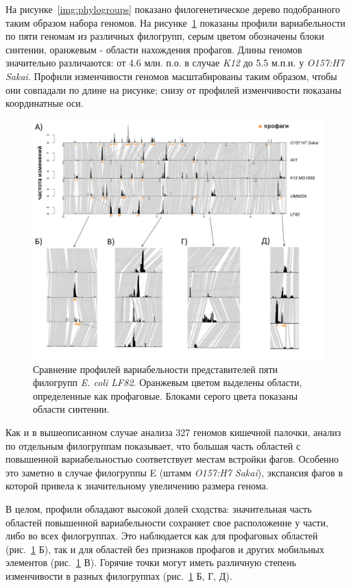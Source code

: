 На рисунке~\ref{img:phylogroups} показано филогенетическое дерево подобранного таким образом набора геномов. На рисунке~\ref{img:phylogroups_complex} показаны профили вариабельности по пяти геномам из различных филогрупп, серым цветом обозначены блоки синтении, оранжевым - области нахождения профагов. Длины геномов значительно различаются: от 4.6 млн. п.о. в случае \textit{K12} до 5.5 м.п.н. у \textit{O157:H7 Sakai}. Профили изменчивости геномов масштабированы таким образом, чтобы они совпадали по длине на рисунке; снизу от профилей изменчивости показаны координатные оси.

\begin{figure}[!ht] 
  \center
    \includegraphics[width=\textwidth]{Dissertation/images/complexity/coli_phylogroups_complexity_3.png}
  \caption{Сравнение профилей вариабельности представителей пяти филогрупп \textit{E. coli LF82}. Оранжевым цветом выделены области, определенные как профаговые. Блоками серого цвета показаны области синтении.}
  \label{img:phylogroups_complex} 
\end{figure}

Как и в вышеописанном случае анализа 327 геномов кишечной палочки, анализ по отдельным филогруппам показывает, что большая часть областей с повышенной вариабельностью соответствует местам встройки фагов. Особенно это заметно в случае филогруппы E (штамм \textit{O157:H7 Sakai}), экспансия фагов в которой привела к значительному увеличению размера генома.   

В целом, профили обладают высокой долей сходства: значительная часть областей повышенной вариабельности сохраняет свое расположение у части, либо во всех филогруппах. Это наблюдается как для профаговых областей (рис.~\ref{img:phylogroups_complex} Б), так и для областей без признаков профагов и других мобильных элементов (рис.~\ref{img:phylogroups_complex} В). Горячие точки могут иметь различную степень изменчивости в разных филогруппах (рис.~\ref{img:phylogroups_complex} Б, Г, Д).

